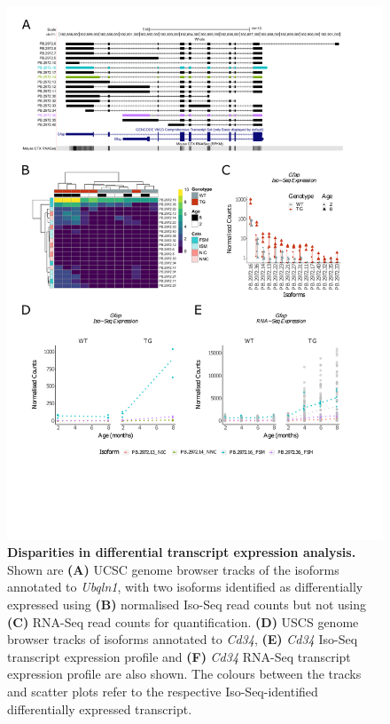 \begin{figure}[!htp]
	\centering
	\includegraphics[page=3,trim={1.5cm 3cm 2cm 1cm}, scale = 0.80]{Figures/Ch5_DiffPlots.pdf}
	\captionsetup{width=0.95\textwidth}
	\caption[Disparities in differential transcript expression analysis]%
	{\textbf{Disparities in differential transcript expression analysis.} Shown are \textbf{(A)} UCSC genome browser tracks of the isoforms annotated to \textit{Ubqln1}, with two isoforms identified as differentially expressed using \textbf{(B)} normalised Iso-Seq read counts but not using \textbf{(C)} RNA-Seq read counts for quantification. \textbf{(D)} USCS genome browser tracks of isoforms annotated to \textit{Cd34}, \textbf{(E)} \textit{Cd34} Iso-Seq transcript expression profile and \textbf{(F)} \textit{Cd34} RNA-Seq transcript expression profile are also shown. The colours between the tracks and scatter plots refer to the respective Iso-Seq-identified differentially expressed transcript.
	}   
	\label{fig:DEI_cd34_ubq}
\end{figure}

